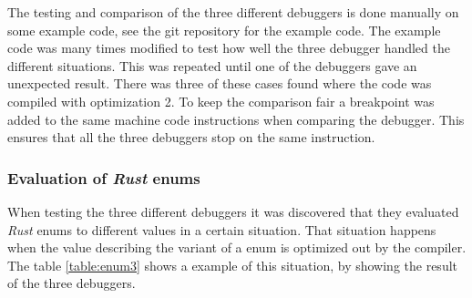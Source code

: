 


The testing and comparison of the three different debuggers is done manually on some example code, see the git repository \cite{example-code} for the example code.
The example code was many times modified to test how well the three debugger handled the different situations.
This was repeated until one of the debuggers gave an unexpected result.
There was three of these cases found where the code was compiled with optimization 2.
To keep the comparison fair a breakpoint was added to the same machine code instructions when comparing the debugger.
This ensures that all the three debuggers stop on the same instruction.


\subsubsection{Evaluation of \emph{Rust} enums}
When testing the three different debuggers it was discovered that they evaluated \emph{Rust} enums to different values in a certain situation.
That situation happens when the value describing the variant of a enum is optimized out by the compiler.
The table \ref{table:enum3} shows a example of this situation, by showing the result of the three debuggers.

